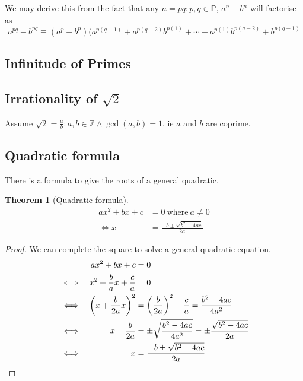 \documentclass[fleqn,a4paper,11pt]{article}
\newcommand{\setstyle}{\mathbb}
\newcommand{\Integers}{\setstyle Z}
\newtheorem{theorem}{Theorem}[section]
\begin{document}
    We may derive this from the fact that any \(n = pq: p, q \in \mathbb P\),
    \(a^n - b^n\) will factorise as
    \begin{equation}
    a^{pq} - b^{pq} \equiv
     (a^p - b^p)(a^{p(q - 1)} + a^{p(q - 2)}b^{p(1)} + \dotsb +
                 a^{p(1)}b^{p(q - 2)} + b^{p(q - 1)}
    \end{equation}

    \subsection{Infinitude of Primes}

    \subsection[Irrationality of \(\sqrt 2\)]
               {Irrationality of \boldmath\(\sqrt 2\)}

    Assume \(\sqrt 2 = \frac ab : a, b \in \Integers \land \gcd(a, b) = 1\), ie
    \(a\) and \(b\) are coprime.

    \subsection{Quadratic formula} \label{sec_quad_formula}

    There is a formula to give the roots of a general quadratic.
    \begin{theorem}[Quadratic formula]
    \begin{align*}
    ax^2 + bx + c &= 0\ \text{where}\ a \neq 0 \\
    \iff x &= \frac{-b \pm \sqrt{b^2 - 4ac}}{2a}
    \end{align*}
    \end{theorem}
    \begin{proof}
    We can complete the square to solve a general quadratic equation.
    \begin{alignat*}{2}
    &&ax^2 + bx + c &= 0 \\
    &\iff& x^2 + \frac{b}{a}x + \frac{c}{a} &= 0 \\
    &\iff& \pqty{x + \frac{b}{2a}x}^2 &= \pqty{\frac{b}{2a}}^2 - \frac{c}{a}
        = \frac{b^2 - 4ac}{4a^2} \\
    &\iff& x + \frac{b}{2a} &= \pm \sqrt{\frac{b^2 - 4ac}{4a^2}}
        = \pm \frac{\sqrt{b^2 - 4ac}}{2a} \\
    &\iff& x &= \frac{-b \pm \sqrt{b^2 - 4ac}}{2a} \qedhere
    \end{alignat*}
    \end{proof}
\end{document}
